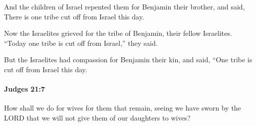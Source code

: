			\begin{versebox}
					\item[BHS] 
					\item[ASV] And the children of Israel repented them for Benjamin their brother, and said, There is one tribe cut off from Israel this day.
					\item[NIV] Now the Israelites grieved for the tribe of Benjamin, their fellow Israelites. “Today one tribe is cut off from Israel,” they said.
					\item[NRSV] But the Israelites had compassion for Benjamin their kin, and said, “One tribe is cut off from Israel this day.
			\end{versebox}

		\paragraph{Judges 21:7} %
			\label{JUDGES-21-7}

			How shall we do for wives for them that remain, seeing we have sworn by the LORD that we will not give them of our daughters to wives?

